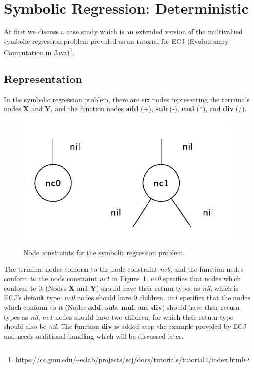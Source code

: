 \section{Symbolic Regression: Deterministic}
At first we discuss a case study which is an extended version of the multivalued symbolic regression problem provided as an tutorial for ECJ (Evolutionary Computation in Java)\footnote{\url{https://cs.gmu.edu/~eclab/projects/ecj/docs/tutorials/tutorial4/index.html}}. 

\subsection{Representation}
In the symbolic regression problem, there are six nodes representing the terminals nodes \textbf{X} and \textbf{Y}, and the function nodes \textbf{add} (+), \textbf{sub} (-), \textbf{mul} (*), and \textbf{div} (/). 
\begin{figure}
	\centering
	\includegraphics[width=0.5\linewidth]{./fig/symbolic_example_ncs}
	\caption{Node constraints for the symbolic regression problem.}
	\label{fig:symb_ncs}
\end{figure}

The terminal nodes conform to the node constraint \emph{nc0}, and the function nodes conform to the node constraint \emph{nc1} in Figure~\ref{fig:symb_ncs}. \emph{nc0} specifies that nodes which conform to it (Nodes \textbf{X} and \textbf{Y}) should have their return types as \emph{nil}, which is ECJ's default type. \emph{nc0} nodes should have 0 children. \emph{nc1} specifies that the nodes which conform to it (Nodes \textbf{add}, \textbf{sub}, \textbf{mul}, and \textbf{div}) should have their return types as \emph{nil}, \emph{nc1} nodes should have two children, for which their return type should also be \emph{nil}. The function \textbf{div} is added atop the example provided by ECJ and needs additional handling which will be discussed later. 

